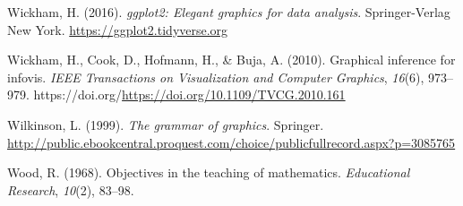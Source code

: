 \documentclass[
  10pt,
  letterpaper,
  DIV=11,
  numbers=noendperiod]{scrartcl}
\newlength{\cslhangindent}
\newenvironment{CSLReferences}[2] %
 {\begin{list}{}{%
  \setlength{\itemindent}{0pt}
  \setlength{\leftmargin}{0pt}
  \setlength{\parsep}{0pt}
  \ifodd #1
   \setlength{\leftmargin}{\cslhangindent}
   \setlength{\itemindent}{-1\cslhangindent}
  \fi
  \setlength{\itemsep}{#2\baselineskip}}}
 {\end{list}}
\begin{document}
\begin{CSLReferences}{1}{0}
Wickham, H. (2016). \emph{ggplot2: Elegant graphics for data analysis}.
Springer-Verlag New York. \url{https://ggplot2.tidyverse.org}

Wickham, H., Cook, D., Hofmann, H., \& Buja, A. (2010). Graphical
inference for infovis. \emph{IEEE Transactions on Visualization and
Computer Graphics}, \emph{16}(6), 973--979.
https://doi.org/\url{https://doi.org/10.1109/TVCG.2010.161}

Wilkinson, L. (1999). \emph{The grammar of graphics}. Springer.
\url{http://public.ebookcentral.proquest.com/choice/publicfullrecord.aspx?p=3085765}

Wood, R. (1968). Objectives in the teaching of mathematics.
\emph{Educational Research}, \emph{10}(2), 83--98.

\end{CSLReferences}
\end{document}
